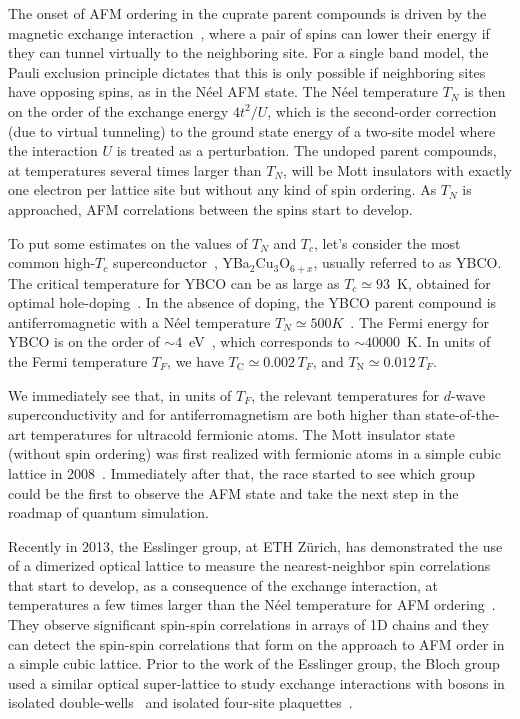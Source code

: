 \documentclass[oneside,11pt]{memoir}
\begin{document}
The onset of AFM ordering in the cuprate parent compounds is driven by the
magnetic exchange interaction~\cite{Koch2012}, where a pair of spins can lower
their energy if they can tunnel virtually to the neighboring site.  For a
single band model, the Pauli exclusion principle dictates that this is only
possible if neighboring sites have opposing spins, as in the N\'{e}el AFM
state.  The N\'{e}el temperature $T_{N}$ is then on the order of the exchange
energy $4t^{2}/U$, which is the second-order correction (due to virtual
tunneling)  to the ground state energy of a two-site model where the
interaction $U$ is treated as a perturbation.   The undoped parent compounds,
at temperatures several times larger than $T_{N}$, will be Mott insulators with
exactly one electron per lattice site but without any kind of spin ordering.
As $T_{N}$ is approached, AFM correlations between the spins start to develop.  

To put some estimates on the values of $T_{N}$ and $T_{c}$, let's consider the
most common high-$T_{c}$ superconductor~\cite{Milton2010},
YBa$_{2}$Cu$_{3}$O$_{6+x}$, usually referred to as YBCO.  The critical
temperature for YBCO can be as large as $T_{c}\simeq 93$~K, obtained for
optimal hole-doping~\cite{Wu1987}. In the absence of doping, the YBCO parent
compound is antiferromagnetic with a N\'{e}el temperature $T_{N} \simeq 500
K$~\cite{Tranquada1988}.  The Fermi energy for YBCO is on the order of $\sim
4$~eV~\cite{liang2008ybco}, which corresponds to $\sim 40000$~K.  In units
of the Fermi temperature $T_{F}$, we have $T_{\text{C}}\simeq0.002\,T_{F}$,
and  $T_{\text{N}}\simeq0.012\,T_{F}$.

We immediately see that, in units of $T_{F}$,  the relevant temperatures for
$d$-wave superconductivity and for antiferromagnetism are both higher than
state-of-the-art temperatures for ultracold fermionic atoms.  The Mott
insulator state (without spin ordering) was first realized with fermionic atoms
in a simple cubic lattice in 2008~\cite{Jordens2008,Schneider2008}.
Immediately after that, the race started to see which group could be the first
to observe the AFM state and take the next step in the roadmap of quantum
simulation.   

Recently in 2013, the Esslinger group, at ETH Z\"{u}rich, has demonstrated the
use of a dimerized optical lattice to measure the nearest-neighbor spin
correlations that start to develop, as a consequence of the exchange
interaction, at temperatures a few times larger than the N\'{e}el temperature
for AFM ordering~\cite{Greif2013}.  They observe significant spin-spin
correlations in arrays of 1D chains and they can detect the spin-spin
correlations that form on the approach to AFM order in a simple cubic lattice.
Prior to the work of the Esslinger group, the Bloch group used  a similar
optical super-lattice to study exchange interactions with bosons in isolated
double-wells~\cite{Trotzky2008} and isolated four-site
plaquettes~\cite{Nascimbene2012}. 
\end{document}

